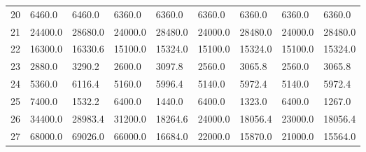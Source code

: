 \begin{tabular}{|r|l|l|l|l|l|l|l|l|}
  20 & 6460.0 & 6460.0 & 6360.0 & 6360.0 & 6360.0 & 6360.0 & 6360.0 & 6360.0 \\ 
  21 & 24400.0 & 28680.0 & 24000.0 & 28480.0 & 24000.0 & 28480.0 & 24000.0 & 28480.0 \\ 
  22 & 16300.0 & 16330.6 & 15100.0 & 15324.0 & 15100.0 & 15324.0 & 15100.0 & 15324.0 \\ 
  23 & 2880.0 & 3290.2 & 2600.0 & 3097.8 & 2560.0 & 3065.8 & 2560.0 & 3065.8 \\ 
  24 & 5360.0 & 6116.4 & 5160.0 & 5996.4 & 5140.0 & 5972.4 & 5140.0 & 5972.4 \\ 
  25 & 7400.0 & 1532.2 & 6400.0 & 1440.0 & 6400.0 & 1323.0 & 6400.0 & 1267.0 \\ 
  26 & 34400.0 & 28983.4 & 31200.0 & 18264.6 & 24000.0 & 18056.4 & 23000.0 & 18056.4 \\ 
  27 & 68000.0 & 69026.0 & 66000.0 & 16684.0 & 22000.0 & 15870.0 & 21000.0 & 15564.0 \\ 
\end{tabular}
